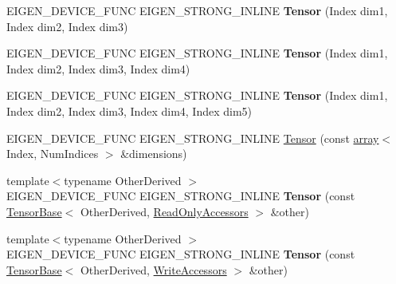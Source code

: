 \begin{DoxyCompactItemize}
E\+I\+G\+E\+N\+\_\+\+D\+E\+V\+I\+C\+E\+\_\+\+F\+U\+NC E\+I\+G\+E\+N\+\_\+\+S\+T\+R\+O\+N\+G\+\_\+\+I\+N\+L\+I\+NE {\bfseries Tensor} (Index dim1, Index dim2, Index dim3)
\item 
\mbox{\label{class_eigen_1_1_tensor_a62b9266a774fa33f3db7035136be3fa6}} 
E\+I\+G\+E\+N\+\_\+\+D\+E\+V\+I\+C\+E\+\_\+\+F\+U\+NC E\+I\+G\+E\+N\+\_\+\+S\+T\+R\+O\+N\+G\+\_\+\+I\+N\+L\+I\+NE {\bfseries Tensor} (Index dim1, Index dim2, Index dim3, Index dim4)
\item 
\mbox{\label{class_eigen_1_1_tensor_ac7f7ba182eee8f6ff7d4b56ba3fd2ea1}} 
E\+I\+G\+E\+N\+\_\+\+D\+E\+V\+I\+C\+E\+\_\+\+F\+U\+NC E\+I\+G\+E\+N\+\_\+\+S\+T\+R\+O\+N\+G\+\_\+\+I\+N\+L\+I\+NE {\bfseries Tensor} (Index dim1, Index dim2, Index dim3, Index dim4, Index dim5)
\item 
E\+I\+G\+E\+N\+\_\+\+D\+E\+V\+I\+C\+E\+\_\+\+F\+U\+NC E\+I\+G\+E\+N\+\_\+\+S\+T\+R\+O\+N\+G\+\_\+\+I\+N\+L\+I\+NE \hyperlink{class_eigen_1_1_tensor_a6ef6b578cd0ca367842b0d8888e22195}{Tensor} (const \hyperlink{class_eigen_1_1array}{array}$<$ Index, Num\+Indices $>$ \&dimensions)
\item 
\mbox{\label{class_eigen_1_1_tensor_ad956c232d59f35a204b80badb3ffd520}} 
{\footnotesize template$<$typename Other\+Derived $>$ }\\E\+I\+G\+E\+N\+\_\+\+D\+E\+V\+I\+C\+E\+\_\+\+F\+U\+NC E\+I\+G\+E\+N\+\_\+\+S\+T\+R\+O\+N\+G\+\_\+\+I\+N\+L\+I\+NE {\bfseries Tensor} (const \hyperlink{class_eigen_1_1_tensor_base}{Tensor\+Base}$<$ Other\+Derived, \hyperlink{group__enums_gga9f93eac38eb83deb0e8dbd42ddf11d5da42865f87356ad7e585a1bfbfd1b81699}{Read\+Only\+Accessors} $>$ \&other)
\item 
\mbox{\label{class_eigen_1_1_tensor_aa46777190f6226871d7fc0902d7d8172}} 
{\footnotesize template$<$typename Other\+Derived $>$ }\\E\+I\+G\+E\+N\+\_\+\+D\+E\+V\+I\+C\+E\+\_\+\+F\+U\+NC E\+I\+G\+E\+N\+\_\+\+S\+T\+R\+O\+N\+G\+\_\+\+I\+N\+L\+I\+NE {\bfseries Tensor} (const \hyperlink{class_eigen_1_1_tensor_base}{Tensor\+Base}$<$ Other\+Derived, \hyperlink{group__enums_gga9f93eac38eb83deb0e8dbd42ddf11d5da2c59ef3697d65866c3a8e16eda7881ab}{Write\+Accessors} $>$ \&other)
\item 
\mbox{\label{class_eigen_1_1_tensor_a0c493c8f67658fc681eb644b138bec79}} 

\end{DoxyCompactItemize}
